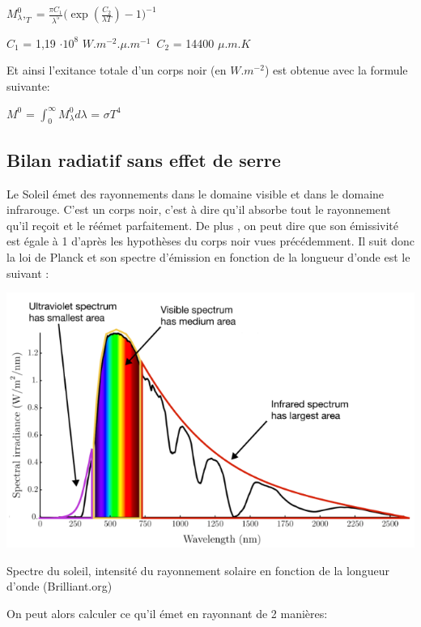\documentclass[a4paper, 12pt]{report} %
\begin{document}
\begin{center}
$M^{0}_\lambda,_T= \frac{\pi C_1}{\lambda^5} \biggl(\exp(\frac{C_2}{\lambda T}) - 1\biggr)^{-1}$ 

$C_1$ = 1,19 $\cdot 10^{8}$ $W.m^{-2}.\mu.m^{-1}$\
$C_2$ = 14400 $\mu.m.K$ \\
\end{center}
Et ainsi l'exitance totale d'un corps noir (en $W.m^{-2}$) est obtenue avec la formule suivante:

\hfil $M^{0}$ = $\int_{0}^{\infty} M^{0}_\lambda d\lambda$ = $\sigma T^{4}$ 

\par

\subsection{Bilan radiatif sans effet de serre} 

Le Soleil émet des rayonnements dans le domaine visible et 
dans le domaine infrarouge. C'est un corps noir, c'est à dire
qu'il absorbe tout le rayonnement qu'il reçoit et le réémet 
parfaitement. De plus , on peut dire que son émissivité est 
égale à 1 d'après les hypothèses du corps noir vues précédemment. Il suit donc la loi de Planck et son spectre d'émission en fonction de 
la longueur d'onde est le suivant : 
\begin{center}
    \includegraphics[scale=0.85]{Images/Spectre Soleil.png}
    
    Spectre du soleil, intensité du rayonnement solaire en fonction de la longueur d’onde (Brilliant.org)  
\end{center} \vspace{\baselineskip}

\noindent On peut alors calculer ce qu'il émet en rayonnant de 2 manières: \vspace{\baselineskip}
\end{document}
